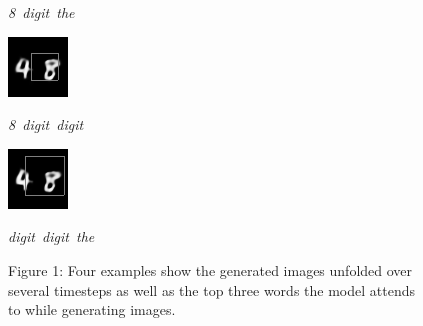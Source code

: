 \documentclass{article} %
\begin{document}
\begin{figure}[t]
  \caption{\mbox{\textit{8 digit the}}}
\endminipage\hfill
{}
  \includegraphics[width=\linewidth]{figures/4-8-25.png}
  \caption{\mbox{\textit{8 digit digit}}}
\endminipage\hfill
{}
  \includegraphics[width=\linewidth]{figures/4-8-28.png}
  \caption{\mbox{\textit{digit digit the}}}
\endminipage\hfill

\captionsetup{labelformat=empty}
\caption{Figure 1: Four examples show the generated images unfolded over several timesteps as well as the top three words the model attends to while generating images.}
\end{figure}
\end{document}
